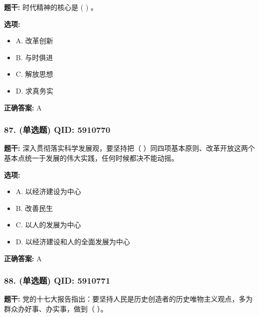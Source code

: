 \documentclass[12pt,UTF8]{ctexart}
\begin{document}
\textbf{题干:}
时代精神的核心是  ( )  。

\textbf{选项:}
\begin{itemize}[leftmargin=*]

  \item A. 改革创新

  \item B. 与时俱进

  \item C. 解放思想

  \item D. 求真务实

\end{itemize}

\textbf{正确答案:}
A

\vspace{0.3em}\hrulefill\vspace{0.7em}

\subsubsection*{87. (单选题) \small QID: 5910770}

\textbf{题干:}
深入贯彻落实科学发展观，要坚持把（ ）同四项基本原则、改革开放这两个基本点统一于发展的伟大实践，任何时候都决不能动摇。

\textbf{选项:}
\begin{itemize}[leftmargin=*]

  \item A. 以经济建设为中心

  \item B. 改善民生

  \item C. 以人的发展为中心

  \item D. 以经济建设和人的全面发展为中心

\end{itemize}

\textbf{正确答案:}
A

\vspace{0.3em}\hrulefill\vspace{0.7em}

\subsubsection*{88. (单选题) \small QID: 5910771}

\textbf{题干:}
党的十七大报告指出：要坚持人民是历史创造者的历史唯物主义观点，多为群众办好事、办实事，做到（ ）。
\end{document}
